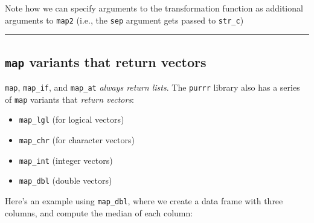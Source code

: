 \documentclass[]{book}
\newenvironment{Shaded}{\begin{snugshade}}{\end{snugshade}}
\newcommand{\CommentTok}[1]{\textcolor[rgb]{0.56,0.35,0.01}{\textit{#1}}}
\newcommand{\DecValTok}[1]{\textcolor[rgb]{0.00,0.00,0.81}{#1}}
\newcommand{\KeywordTok}[1]{\textcolor[rgb]{0.13,0.29,0.53}{\textbf{#1}}}
\newcommand{\NormalTok}[1]{#1}
\newcommand{\OperatorTok}[1]{\textcolor[rgb]{0.81,0.36,0.00}{\textbf{#1}}}
\newcommand{\StringTok}[1]{\textcolor[rgb]{0.31,0.60,0.02}{#1}}
\providecommand{\tightlist}{%
  \setlength{\itemsep}{0pt}\setlength{\parskip}{0pt}}
\theoremstyle{definition}
\theoremstyle{definition}
\theoremstyle{definition}
\theoremstyle{remark}
\begin{document}
Note how we can specify arguments to the transformation function as
additional arguments to \texttt{map2} (i.e., the \texttt{sep} argument
gets passed to \texttt{str\_c})

\begin{center}\rule{0.5\linewidth}{\linethickness}\end{center}

\hypertarget{map-variants-that-return-vectors}{%
\subsection{\texorpdfstring{\texttt{map} variants that return
vectors}{map variants that return vectors}}\label{map-variants-that-return-vectors}}

\texttt{map}, \texttt{map\_if}, and \texttt{map\_at} \emph{always return
lists}. The \texttt{purrr} library also has a series of \texttt{map}
variants that \emph{return vectors}:

\begin{itemize}
\tightlist
\item
  \texttt{map\_lgl} (for logical vectors)
\item
  \texttt{map\_chr} (for character vectors)
\item
  \texttt{map\_int} (integer vectors)
\item
  \texttt{map\_dbl} (double vectors)
\end{itemize}

\begin{Shaded}
\end{Shaded}

Here's an example using \texttt{map\_dbl}, where we create a data frame
with three columns, and compute the median of each column:
\end{document}
